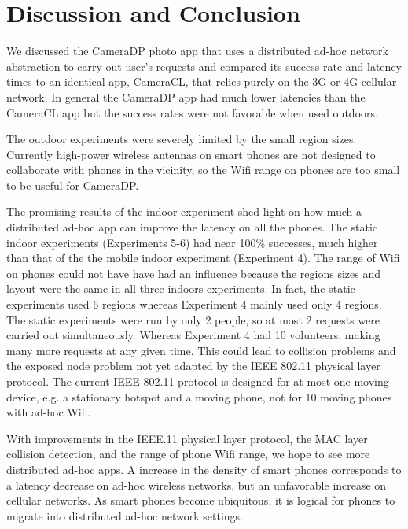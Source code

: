 \chapter{Discussion and Conclusion}

We discussed the CameraDP photo app that uses a distributed ad-hoc network abstraction to carry out user's requests and compared its success rate and latency times to an identical app, CameraCL, that relies purely on the 3G or 4G cellular network. In general the CameraDP app had much lower latencies than the CameraCL app but the success rates were not favorable when used outdoors.

The outdoor experiments were severely limited by the small region sizes. Currently high-power wireless antennas on smart phones are not designed to collaborate with phones in the vicinity, so the Wifi range on phones are too small to be useful for CameraDP.

The promising results of the indoor experiment shed light on how much a distributed ad-hoc app can improve the latency on all the phones. The static indoor experiments (Experiments 5-6) had near 100\% successes, much higher than that of the the mobile indoor experiment (Experiment 4). The range of Wifi on phones could not have have had an influence because the regions sizes and layout were the same in all three indoors experiments. In fact, the static experiments used 6 regions whereas Experiment 4 mainly used only 4 regions. The static experiments were run by only 2 people, so at most 2 requests were carried out simultaneously. Whereas Experiment 4 had 10 volunteers, making many more requests at any given time. This could lead to collision problems and the exposed node problem not yet adapted by the IEEE 802.11 physical layer protocol. The current IEEE 802.11 protocol is designed for at most one moving device, e.g. a stationary hotspot and a moving phone, not for 10 moving phones with ad-hoc Wifi.

With improvements in the IEEE.11 physical layer protocol, the MAC layer collision detection, and the range of phone Wifi range, we hope to see more distributed ad-hoc apps. A increase in the density of smart phones corresponds to a latency decrease on ad-hoc wireless networks, but an unfavorable increase on cellular networks. As smart phones become ubiquitous, it is logical for phones to migrate into distributed ad-hoc network settings.
